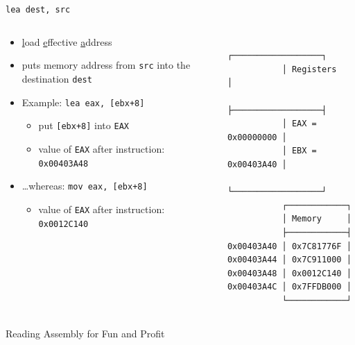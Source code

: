 \documentclass[compress,aspectratio=1610]{beamer}
\newcommand{\inputcpplisting}[1]{}
\newcommand{\inputasmlisting}[1]{}
\begin{document}
\begin{frame}[fragile]{\texttt{lea dest, src}}
    \begin{columns}
        \begin{column}{.5\textwidth}
            \begin{itemize}
                \item \underline{l}oad \underline{e}ffective \underline{a}ddress
                \item puts memory address from \texttt{src} into the destination \texttt{dest}
                \item Example: \texttt{lea eax, [ebx+8]}
                \begin{itemize}
                    \item put \texttt{[ebx+8]} into \texttt{EAX}
                    \item value of \texttt{EAX} after instruction: \texttt{0x00403A48}
                \end{itemize}
                \item \ldots whereas: \texttt{mov eax, [ebx+8]}
                \begin{itemize}
                    \item value of \texttt{EAX} after instruction: \texttt{0x0012C140}
                \end{itemize}
            \end{itemize}
        \end{column}
        \begin{column}{.5\textwidth}
            \begin{Verbatim}
           ┌──────────────────┐
           │ Registers        │
           ├──────────────────┤
           │ EAX = 0x00000000 │ 
           │ EBX = 0x00403A40 │ 
           └──────────────────┘
           ┌────────────┐
           │ Memory     │
           ├────────────┤
0x00403A40 │ 0x7C81776F │ 
0x00403A44 │ 0x7C911000 │ 
0x00403A48 │ 0x0012C140 │ 
0x00403A4C │ 0x7FFDB000 │ 
           └────────────┘
            \end{Verbatim}
        \end{column}
    \end{columns}
\end{frame}

\begin{frame}[fragile]{Reading Assembly for Fun and Profit}
    \begin{columns}[t]
        \begin{column}{.45\textwidth}
            \inputcpplisting{snippet5a}
            
            \only<2>{%
            \inputasmlisting{snippet5b}}
        \end{column}
        \begin{column}{.45\textwidth}
            \inputasmlisting{snippet5a}
        \end{column}
    \end{columns}
\end{frame}
\end{document}
